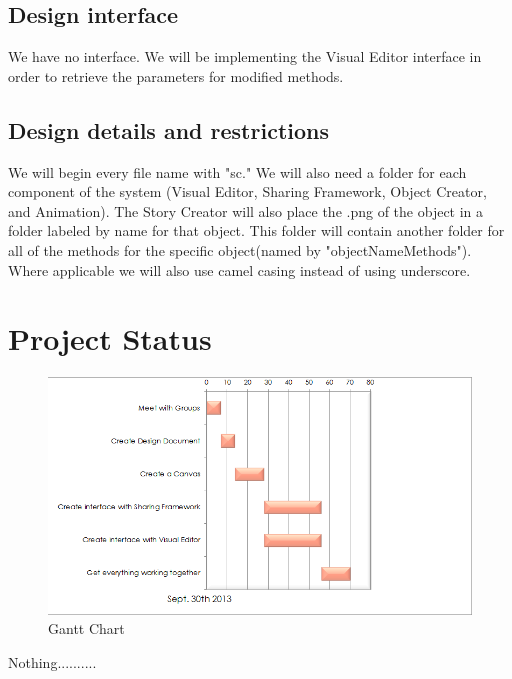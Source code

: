 \documentclass[12pt]{article}
\begin{document}
\subsection{Design interface}
We have no interface.  We will be implementing the Visual Editor interface in order to retrieve the parameters for modified methods.

\subsection{Design details and restrictions}
We will begin every file name with "sc."  We will also need a folder for each component of the system (Visual Editor, Sharing Framework, Object Creator, and Animation).  The Story Creator will also place the .png of the object in a folder labeled by name for that object.  This folder will contain another folder for all of the methods for the specific object(named by "objectNameMethods").  Where applicable we will also use camel casing instead of using underscore.


\section{Project Status}

\begin{figure}[ht!]
\centering
\includegraphics{GanttChart.png}
\caption{Gantt Chart}
\label{overflow}
\end{figure}

Nothing..........




%
\end{document}
